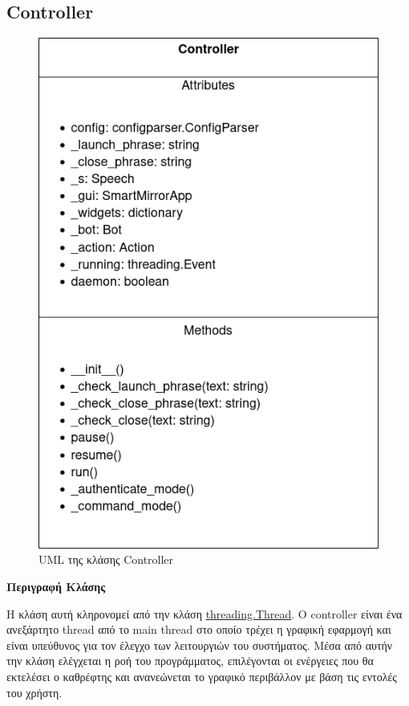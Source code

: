 \subsection{Controller}
\begin{figure}[h!]
    \centering
    \includegraphics[scale=0.7]{images/chapter4/uml_diagrams/Controller.png}
    \caption{UML της κλάσης Controller}
    \label{fig:controller}
\end{figure}
\noindent\textbf{Περιγραφή Κλάσης}

Η κλάση αυτή κληρονομεί από την κλάση \href{https://docs.python.org/3/library/threading.html\#threading.Thread}{threading.Thread}. O controller είναι ένα ανεξάρτητο thread από το main thread στο οποίο τρέχει η γραφική εφαρμογή και είναι υπεύθυνος για τον έλεγχο των λειτουργιών του συστήματος. Μέσα από αυτήν την κλάση ελέγχεται η ροή του προγράμματος, επιλέγονται οι ενέργειες που θα εκτελέσει ο καθρέφτης και ανανεώνεται το γραφικό περιβάλλον με βάση τις εντολές του χρήστη.

